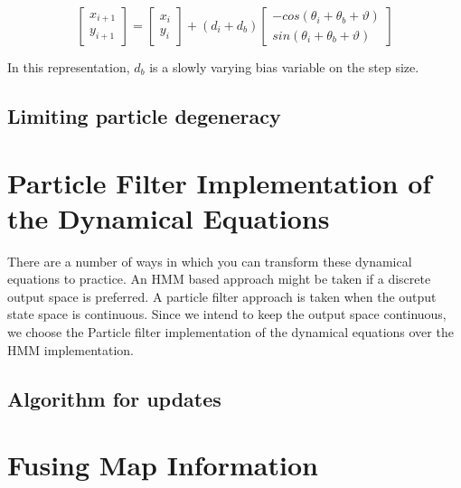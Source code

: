 \begin{equation}
\begin{bmatrix}x_{i+1}\\
y_{i+1}
\end{bmatrix} = \begin{bmatrix}x_{i}\\
y_{i}
\end{bmatrix}  + (d{}_{i}+d_{b}) \begin{bmatrix}-cos(\theta_{i}+\theta_{b}+\vartheta)\\
sin(\theta_{i}+\theta_{b}+\vartheta)
\end{bmatrix} 
\end{equation}

In this representation, $d_{b}$ is a slowly varying bias variable on the step
size.

\subsection{Limiting particle degeneracy}


\section{Particle Filter Implementation of the Dynamical Equations}

There are a number of ways in which you can transform these dynamical 
equations to practice. An HMM based approach might be taken if a discrete
output space is preferred. A particle filter approach is taken when the 
output state space is continuous. Since we intend to keep the output space
continuous, we choose the Particle filter implementation of the dynamical
equations over the HMM implementation.

\subsection{Algorithm for updates}


\section{Fusing Map Information}


